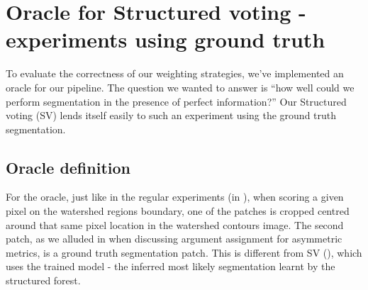 \section[Oracle for Structured voting]{Oracle for Structured voting - experiments using ground truth}
\label{sec:ch5-oracle}
To evaluate the correctness of our weighting strategies, we've implemented an oracle for our pipeline. The question we wanted to answer is ``how well could we perform segmentation in the presence of perfect information?'' Our Structured voting (SV) lends itself easily to such an experiment using the ground truth segmentation. 

\subsection{Oracle definition}
For the oracle, just like in the regular experiments (in ), when scoring a given pixel on the watershed regions boundary, one of the patches is cropped centred around that same pixel location in the watershed contours image. The second patch, as we alluded %
in  when discussing argument assignment for asymmetric metrics, is a ground truth segmentation patch. This is different from SV (), which uses the trained model - the inferred most likely segmentation learnt by the structured forest.



